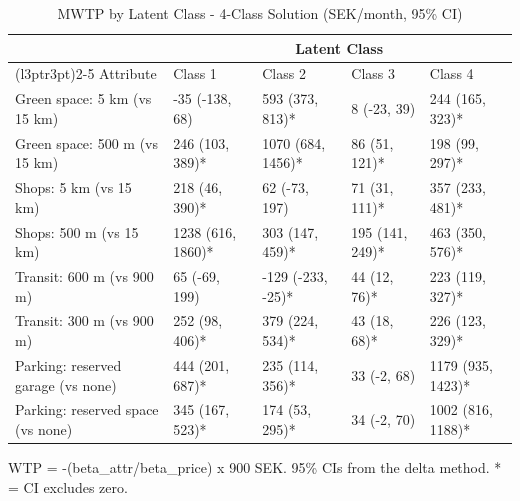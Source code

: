 \begin{table}[!h]
\centering
\caption{MWTP by Latent Class - 4-Class Solution (SEK/month, 95\% CI)}
\centering
\begin{threeparttable}
\begin{tabular}[t]{lllll}
\toprule
\multicolumn{1}{c}{ } & \multicolumn{4}{c}{Latent Class} \\
\cmidrule(l{3pt}r{3pt}){2-5}
Attribute & Class 1 & Class 2 & Class 3 & Class 4\\
\midrule
Green space: 5 km (vs 15 km) & -35 (-138, 68) & 593 (373, 813)* & 8 (-23, 39) & 244 (165, 323)*\\
Green space: 500 m (vs 15 km) & 246 (103, 389)* & 1070 (684, 1456)* & 86 (51, 121)* & 198 (99, 297)*\\
Shops: 5 km (vs 15 km) & 218 (46, 390)* & 62 (-73, 197) & 71 (31, 111)* & 357 (233, 481)*\\
Shops: 500 m (vs 15 km) & 1238 (616, 1860)* & 303 (147, 459)* & 195 (141, 249)* & 463 (350, 576)*\\
Transit: 600 m (vs 900 m) & 65 (-69, 199) & -129 (-233, -25)* & 44 (12, 76)* & 223 (119, 327)*\\
\addlinespace
Transit: 300 m (vs 900 m) & 252 (98, 406)* & 379 (224, 534)* & 43 (18, 68)* & 226 (123, 329)*\\
Parking: reserved garage (vs none) & 444 (201, 687)* & 235 (114, 356)* & 33 (-2, 68) & 1179 (935, 1423)*\\
Parking: reserved space (vs none) & 345 (167, 523)* & 174 (53, 295)* & 34 (-2, 70) & 1002 (816, 1188)*\\
\bottomrule
\end{tabular}
\begin{tablenotes}
\item WTP = -(beta\_attr/beta\_price) x 900 SEK. 95\% CIs from the delta method. * = CI excludes zero.
\end{tablenotes}
\end{threeparttable}
\end{table}
